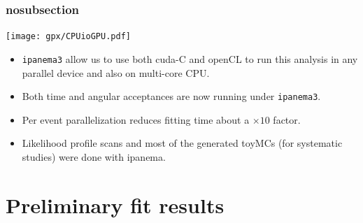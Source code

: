 \documentclass[aspectratio=169,9pt,handout]{beamer}
\newcommand{\pdfnote}[1]{}
\begin{document}
\begin{frame}[default] %
\frametitle{nosubsection}

\begin{center}
  \texttt{[image: gpx/CPUioGPU.pdf]}
\end{center}

\begin{multicols}{2}
  \begin{itemize}
    \item \texttt{ipanema3} allow us to use both cuda-C and openCL to run this analysis in
    any parallel device and also on multi-core CPU. \vfill
    \item Both time and angular acceptances are now running under \texttt{ipanema3}. 
    \item Per event parallelization reduces fitting time about a $\times 10$ factor.
    \item Likelihood profile scans and most of the generated toyMCs (for systematic studies) were done with ipanema.
  \end{itemize}
\end{multicols}

\pdfnote{Here I want to show a slide about how these computations are beeing done. The phis team in Santiago develop a gpu-based calculation of both time and angular accepntaces. }
\pdfnote{To do so, we use ipanema3 which is a python package, which plays the go-between role here betwen the user and the gpu device.}

\end{frame} %



\section{Preliminary fit results}
\end{document}
